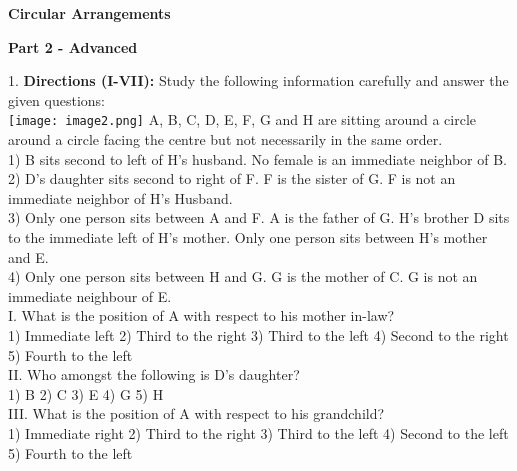 \documentclass[
]{article}
\author{}
\date{}
\begin{document}
	
 

\begin{center}
	{\Large \textbf{Circular Arrangements \\}}
\end{center}

{\large \textbf{ Part 2 - Advanced \\}}

1. \textbf{Directions (I-VII):} Study the following information carefully and answer the given
questions:\\
\texttt{[image: image2.png]}
A, B, C, D, E, F, G and H are sitting around a circle around a circle facing the centre but not
necessarily in the same order.\\
1) B sits second to left of H’s husband. No female is an immediate neighbor of B.\\
2) D’s daughter sits second to right of F. F is the sister of G. F is not an immediate neighbor
of H’s Husband.\\
3) Only one person sits between A and F. A is the father of G. H’s brother D sits to the
immediate left of H’s mother. Only one person sits between H’s mother and E.\\
4) Only one person sits between H and G. G is the mother of C. G is not an immediate
neighbour of E.\\

I. What is the position of A with respect to his mother in-law?\\
1) Immediate left \hspace{2mm}2) Third to the right \hspace{2mm}3) Third to the left
\hspace{2mm}4) Second to the right \hspace{2mm}5) Fourth to the left\\

II. Who amongst the following is D’s daughter?\\
1) B \hspace{2mm}2) C \hspace{2mm}3) E \hspace{2mm}4) G \hspace{2mm}5) H\\

III. What is the position of A with respect to his grandchild?\\
1) Immediate right \hspace{2mm}2) Third to the right \hspace{2mm}3) Third to the left
\hspace{2mm}4) Second to the left \hspace{2mm}5) Fourth to the left\\
\end{document}
